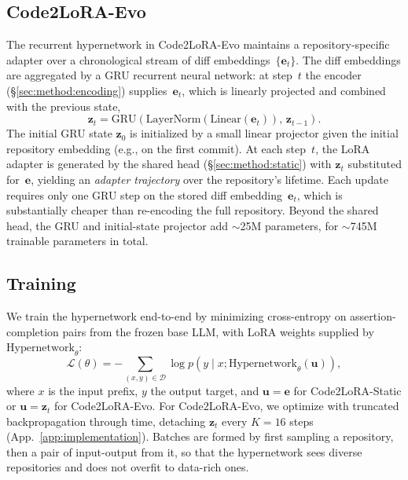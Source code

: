 \documentclass[11pt]{article}
\newcommand{\codelora}{Code2LoRA\xspace}
\newcommand{\codelorastatic}{\codelora-Static\xspace}
\newcommand{\codeloraevo}{\codelora-Evo\xspace}
\begin{document}
\subsection{\codeloraevo{}}
\label{sec:method:evo}

The recurrent hypernetwork in \codeloraevo{} maintains a repository-specific adapter over a chronological stream of diff embeddings~$\{\mathbf{e}_t\}$.
The diff embeddings are aggregated by a GRU recurrent neural network:
at step~$t$ the encoder (\S\ref{sec:method:encoding}) supplies~$\mathbf{e}_t$, which is linearly projected and combined with the previous state,
\begin{equation*}
\mathbf{z}_t = \mathrm{GRU}(\mathrm{LayerNorm}(\mathrm{Linear}(\mathbf{e}_t)),\, \mathbf{z}_{t-1}).
\end{equation*}
The initial GRU state $\mathbf{z}_0$ is initialized by a small linear projector given the initial repository embedding (e.g., on the first commit).
At each step~$t$, the LoRA adapter is generated by the shared head (\S\ref{sec:method:static}) with $\mathbf{z}_t$ substituted for~$\mathbf{e}$, yielding an \emph{adapter trajectory} over the repository's lifetime.
Each update requires only one GRU step on the stored diff embedding~$\mathbf{e}_t$, which is substantially cheaper than re-encoding the full repository.
Beyond the shared head, the GRU and initial-state projector add ${\sim}$25M parameters, for ${\sim}$745M trainable parameters in total.

\subsection{Training}
\label{sec:method:training}

We train the hypernetwork end-to-end by minimizing cross-entropy on assertion-completion pairs from the frozen base LLM, with LoRA weights supplied by $\mathrm{Hypernetwork}_\theta$:
\begin{equation*}
\mathcal{L}(\theta) = -\!\!\!\sum_{(x,y) \in \mathcal{D}}\!\!\! \log p\!\left(y \mid x; \mathrm{Hypernetwork}_\theta(\mathbf{u})\right),
\end{equation*}
where $x$ is the input prefix, $y$ the output target, and $\mathbf{u}=\mathbf{e}$ for \codelorastatic{} or $\mathbf{u}=\mathbf{z}_t$ for \codeloraevo{}.
For \codeloraevo{}, we optimize with truncated backpropagation through time, detaching $\mathbf{z}_t$ every $K{=}16$ steps (App.~\ref{app:implementation}).
Batches are formed by first sampling a repository, then a pair of input-output from it, so that the hypernetwork sees diverse repositories and does not overfit to data-rich ones.
\end{document}
